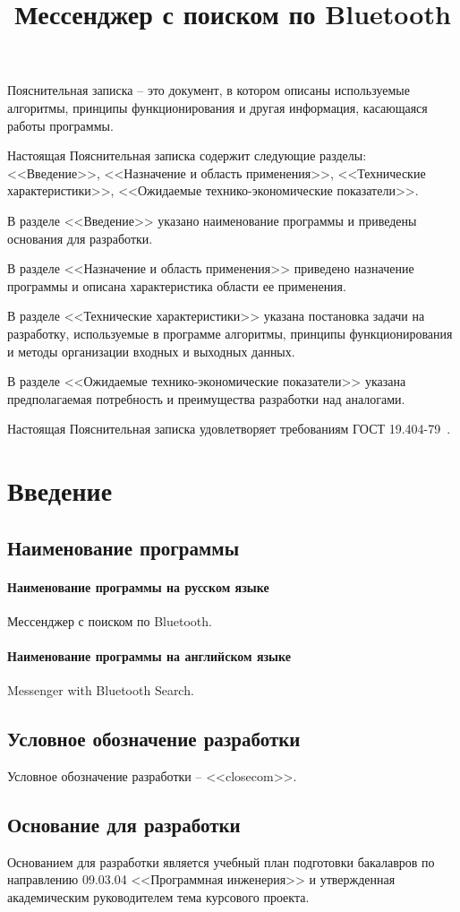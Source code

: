 \documentclass[explnote]{espd}
\title{Мессенджер с поиском по Bluetooth}
\begin{document}
\annotation
Пояснительная записка -- это документ, в котором описаны используемые алгоритмы, принципы функционирования и другая информация, касающаяся работы программы.

Настоящая Пояснительная записка содержит следующие разделы: <<Введение>>, <<Назначение и область применения>>, <<Технические характеристики>>, <<Ожидаемые технико-экономические показатели>>.

В разделе <<Введение>> указано наименование программы и приведены основания для разработки.

В разделе <<Назначение и область применения>> приведено назначение программы и описана характеристика области ее применения.

В разделе <<Технические характеристики>> указана постановка задачи на разработку, используемые в программе алгоритмы, принципы функционирования и методы организации входных и выходных данных.

В разделе <<Ожидаемые технико-экономические показатели>> указана предполагаемая потребность и преимущества разработки над аналогами.

Настоящая Пояснительная записка удовлетворяет требованиям ГОСТ 19.404-79~\cite{espd404}.

\tableofcontents

\section{Введение}
\subsection{Наименование программы}
\paragraph{Наименование программы на русском языке}
Мессенджер с поиском по Bluetooth.
\paragraph{Наименование программы на английском языке}
Messenger with Bluetooth Search.

\subsection{Условное обозначение разработки}
Условное обозначение разработки -- <<closecom>>.

\subsection{Основание для разработки}
Основанием для разработки является учебный план подготовки бакалавров по направлению 09.03.04 <<Программная инженерия>> и утвержденная академическим руководителем тема курсового проекта.
\end{document}
